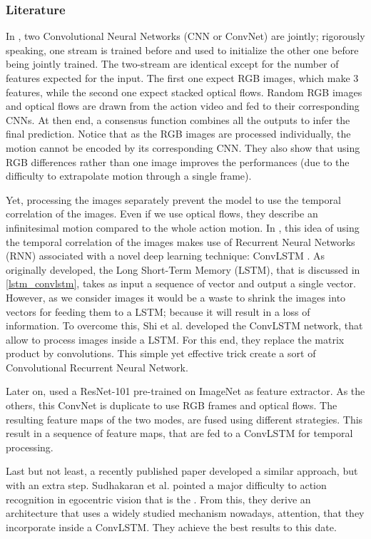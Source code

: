 \documentclass[12pt, a4paper]{report}
\begin{document}
				\subsubsection{Literature}
					In \cite{wang2016temporal}, two Convolutional Neural Networks (CNN or ConvNet) are \gls{jointly}; rigorously speaking, one stream is trained before and used to initialize the other one before being jointly trained.
					The two-stream are identical except for the number of features expected for the input.
					The first one expect RGB images, which make 3 features, while the second one expect stacked optical flows.
					Random RGB images and optical flows are drawn from the action video and fed to their corresponding CNNs.
					At then end, a consensus function combines all the outputs to infer the final prediction.
					Notice that as the RGB images are processed individually, the motion cannot be encoded by its corresponding CNN.
					They also show that using RGB differences rather than one image improves the performances (due to the difficulty to extrapolate motion through a single frame).
					\par
					Yet, processing the images separately prevent the model to use the temporal correlation of the images.
					Even if we use optical flows, they describe an infinitesimal motion compared to the whole action motion.
					In \cite{ye2019two}, this idea of using the temporal correlation of the images makes use of Recurrent Neural Networks (RNN) associated with a novel deep learning technique: ConvLSTM \cite{shi2015convolutional}.
					As originally developed, the Long Short-Term Memory (LSTM), that is discussed in \ref{lstm_convlstm}, takes as input a sequence of vector and output a single vector.
					However, as we consider images it would be a waste to shrink the images into vectors for feeding them to a LSTM; because it will result in a loss of information.
					To overcome this, Shi et al. \cite{shi2015convolutional} developed the ConvLSTM network, that allow to process images inside a LSTM.
					For this end, they replace the matrix product by convolutions.
					This simple yet effective trick create a sort of Convolutional Recurrent Neural Network.
					\par
					Later on, \cite{ye2019two} used a ResNet-101 pre-trained on ImageNet as feature extractor.
					As the others, this ConvNet is duplicate to use RGB frames and optical flows.
					The resulting feature maps of the two modes, are fused using different strategies.
					This result in a sequence of feature maps, that are fed to a ConvLSTM for temporal processing.
					\par
					Last but not least, a recently published paper developed a similar approach, but with an extra step.
					Sudhakaran et al. \cite{sudhakaran2019lsta} pointed a major difficulty to action recognition in egocentric vision that is the .
					From this, they derive an architecture that uses a widely studied mechanism nowadays, attention, that they incorporate inside a ConvLSTM.  %
					They achieve the best results to this date.
					\par
\end{document}
